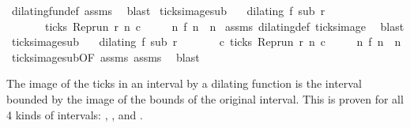 \begin{isabellebody}
%
\isadelimproof
%
\endisadelimproof
%
\isatagproof
{}\isamarkupfalse%
\ dilating{\isacharunderscore}fun{\isacharunderscore}def\ assms\ \isamarkupfalse%
\ blast%
\endisatagproof
{\isafoldproof}%
%
\isadelimproof
\isanewline
%
\endisadelimproof
\isanewline
{}\isamarkupfalse%
\ ticks{\isacharunderscore}image{\isacharunderscore}sub{\isacharcolon}\isanewline
\ \ \ {\isacartoucheopen}dilating\ f\ sub\ r{\isacartoucheclose}\isanewline
\ \ \ \ \ \ \ {\isacartoucheopen}ticks\ {\isacharparenleft}{\isacharparenleft}Rep{\isacharunderscore}run\ r{\isacharparenright}\ n\ c{\isacharparenright}{\isacartoucheclose}\isanewline
\ \ \ \ \ {\isacartoucheopen}{\isasymexists}n\ f\ n\ {\isacharequal}\ n{\isacartoucheclose}\isanewline
%
\isadelimproof
%
\endisadelimproof
%
\isatagproof
{}\isamarkupfalse%
\ assms\ dilating{\isacharunderscore}def\ ticks{\isacharunderscore}image\ \isamarkupfalse%
\ blast%
\endisatagproof
{\isafoldproof}%
%
\isadelimproof
\isanewline
%
\endisadelimproof
\isanewline
{}\isamarkupfalse%
\ ticks{\isacharunderscore}image{\isacharunderscore}sub{\isacharprime}{\isacharcolon}\isanewline
\ \ \ {\isacartoucheopen}dilating\ f\ sub\ r{\isacartoucheclose}\isanewline
\ \ \ \ \ \ \ {\isacartoucheopen}{\isasymexists}c{\isachardot}\ ticks\ {\isacharparenleft}{\isacharparenleft}Rep{\isacharunderscore}run\ r{\isacharparenright}\ n\ c{\isacharparenright}{\isacartoucheclose}\isanewline
\ \ \ \ \ {\isacartoucheopen}{\isasymexists}n\ f\ n\ {\isacharequal}\ n{\isacartoucheclose}\isanewline
%
\isadelimproof
%
\endisadelimproof
%
\isatagproof
{}\isamarkupfalse%
\ ticks{\isacharunderscore}image{\isacharunderscore}sub{\isacharbrackleft}OF\ assms{\isacharparenleft}{}{\isacharparenright}{\isacharbrackright}\ assms{\isacharparenleft}{}{\isacharparenright}\ \isamarkupfalse%
\ blast%
\endisatagproof
{\isafoldproof}%
%
\isadelimproof
%
\endisadelimproof
%
\begin{isamarkuptext}%
The image of the ticks in an interval by a dilating function is the interval 
  bounded by the image of the bounds of the original interval.
  This is proven for all 4 kinds of intervals:  \isatt{]m{\char`\,}\ n[}, \isatt{[m{\char`\,}\ n[}, \isatt{]m{\char`\,}\ n]}
  and \isatt{[m{\char`\,}\ n]}.%

\end{isamarkuptext}
\end{isabellebody}
